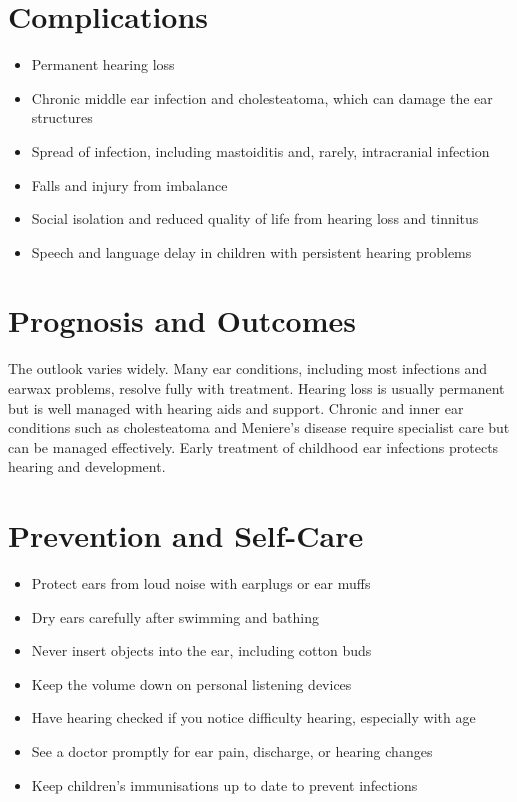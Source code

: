 \section*{Complications}
\begin{itemize}
    \item Permanent hearing loss
    \item Chronic middle ear infection and cholesteatoma, which can damage the ear structures
    \item Spread of infection, including mastoiditis and, rarely, intracranial infection
    \item Falls and injury from imbalance
    \item Social isolation and reduced quality of life from hearing loss and tinnitus
    \item Speech and language delay in children with persistent hearing problems
\end{itemize}

\section*{Prognosis and Outcomes}
The outlook varies widely. Many ear conditions, including most infections and earwax problems, resolve fully with treatment. Hearing loss is usually permanent but is well managed with hearing aids and support. Chronic and inner ear conditions such as cholesteatoma and Meniere's disease require specialist care but can be managed effectively. Early treatment of childhood ear infections protects hearing and development.

\section*{Prevention and Self-Care}
\begin{itemize}
    \item Protect ears from loud noise with earplugs or ear muffs
    \item Dry ears carefully after swimming and bathing
    \item Never insert objects into the ear, including cotton buds
    \item Keep the volume down on personal listening devices
    \item Have hearing checked if you notice difficulty hearing, especially with age
    \item See a doctor promptly for ear pain, discharge, or hearing changes
    \item Keep children's immunisations up to date to prevent infections
\end{itemize}

